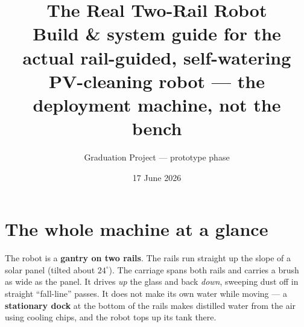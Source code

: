 \documentclass[11pt,a4paper]{article}
\title{\vspace{-1.5cm}\textbf{The Real Two-Rail Robot}\\[3pt]
\large Build \& system guide for the actual rail-guided, self-watering\\[2pt]
\large PV-cleaning robot --- the deployment machine, not the bench}
\author{Graduation Project --- prototype phase}
\date{17 June 2026}
\begin{document}
\maketitle
\vspace{-0.5cm}

\noindent{}

\tableofcontents

\section{The whole machine at a glance}

The robot is a \textbf{gantry on two rails}. The rails run straight up the slope of a solar panel
(tilted about $24^{\circ}$). The carriage spans both rails and carries a brush as wide as the panel.
It drives \emph{up} the glass and back \emph{down}, sweeping dust off in straight ``fall-line'' passes.
It does not make its own water while moving --- a \textbf{stationary dock} at the bottom of the rails
makes distilled water from the air using cooling chips, and the robot tops up its tank there.
\end{document}
